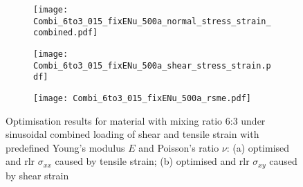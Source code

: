 \begin{figure}[H]
\centering
\begin{subfigure}[t]{0.495\textwidth}
    \centering
    \texttt{[image: Combi\_6to3\_015\_fixENu\_500a\_normal\_stress\_strain\_combined.pdf]}
    \caption{}
    \label{subfig:CombiTensileStressStrainCurve}
\end{subfigure}
\hfill
\begin{subfigure}[t]{0.495\textwidth}
    \centering
    \texttt{[image: Combi\_6to3\_015\_fixENu\_500a\_shear\_stress\_strain.pdf]}
    \caption{}
    \label{subfig:CombiShearStressStrain}
\end{subfigure}
\begin{subfigure}[t]{0.495\textwidth}
    \centering
    \texttt{[image: Combi\_6to3\_015\_fixENu\_500a\_rsme.pdf]}
    \caption{}
    \label{fig:combiRMSE}
\end{subfigure}
\caption{Optimisation results for material with mixing ratio 6:3 under sinusoidal combined loading of shear and tensile strain with predefined Young's modulus $E$ and Poisson's ratio $\nu$: (a) optimised and \acrfull{rlr} $\sigma_{xx}$ caused by tensile strain; (b) optimised and \acrfull{rlr} $\sigma_{xy}$ caused by shear strain}
\label{fig:CombiResults6to3}
\end{figure}


